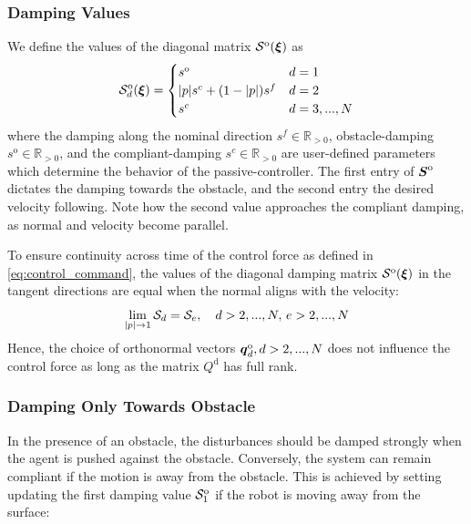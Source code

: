 \subsubsection{Damping Values}
We define the values of the diagonal matrix $\mathcal{S}^{\mathrm{o}}(\boldsymbol{\xi})$ as\begin{equation}
  \mathcal{S}_d^{\mathrm{o}}(\boldsymbol{\xi}) =
  \begin{cases}
    s^{\mathrm{o}} & d = 1 \\
    | p | s^c + (1 - | p |) s^{f} & d = 2 \\
    s^c & d = 3, ..., N
  \end{cases}
  \label{eq:obstacle_damping_values}
\end{equation}
where the damping along the nominal direction $s^{f} \in \mathbb{R}_{>0}$, obstacle-damping $s^{\mathrm{o}} \in \mathbb{R}_{>0}$, and the compliant-damping $s^c \in \mathbb{R}_{>0}$ are user-defined parameters which determine the behavior of the passive-controller. The first entry of $\boldsymbol{S}^{\mathrm{o}}$ dictates the damping towards the obstacle, and the second entry the desired velocity following. Note how the second value approaches the compliant damping, as normal and velocity become parallel.

To ensure continuity across time of the control force as defined in \eqref{eq:control_command}, the values of the diagonal damping matrix  $\mathcal{S}^{\mathrm{o}}(\boldsymbol{\xi})$ in the tangent directions are equal when the normal aligns with the velocity:
\begin{equation}
    \lim_{| p | \rightarrow 1} \mathcal{S}_d = \mathcal{S}_e, 
    \quad d > 2, ..., N, \, e > 2, ..., N
\end{equation}
Hence, the choice of orthonormal vectors $\boldsymbol{q}_d^{\mathrm{o}}, d > 2, ..., N$ does not influence the control force as long as the matrix $Q^{\mathrm{d}}$ has full rank.


\subsubsection{Damping Only Towards Obstacle} \label{sec:damping_only_toward}
In the presence of an obstacle, the disturbances should be damped strongly when the agent is pushed against the obstacle. Conversely, the system can remain compliant if the motion is away from the obstacle. This is achieved by setting updating the first damping value $\mathcal{S}^{\mathrm{o}}_1$ if the robot is moving away from the surface: 

